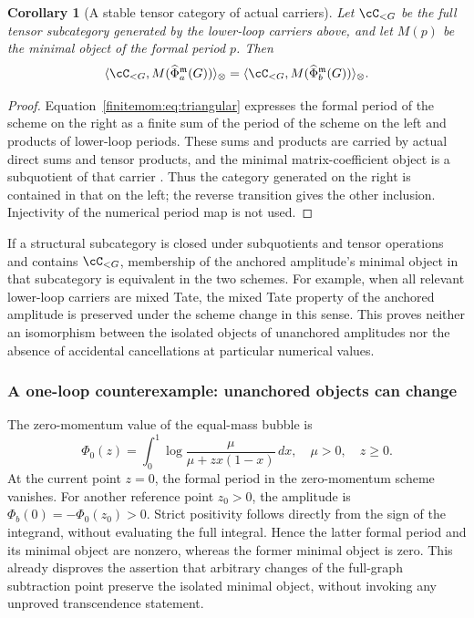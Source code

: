 \documentclass[11pt,a4paper,oneside]{article}
\theoremstyle{plain}
\newtheorem{corollary}[theorem]{Corollary}
\theoremstyle{definition}
\theoremstyle{remark}
\numberwithin{equation}{section}
\begin{document}
\begin{corollary}[A stable tensor category of actual carriers]\label{finitemom:cor:category}
Let $\cC_{<G}$ be the full tensor subcategory generated by the lower-loop carriers above, and let $M(p)$ be the minimal object of the formal period $p$.
Then
\begin{equation}\label{finitemom:eq:category}
 \langle\cC_{<G},M(\widehat\Phi_a^{\mathfrak m}(G))\rangle_\otimes
 =\langle\cC_{<G},M(\widehat\Phi_b^{\mathfrak m}(G))\rangle_\otimes.
\end{equation}
\end{corollary}
\begin{proof}
Equation~\eqref{finitemom:eq:triangular} expresses the formal period of the scheme on the right as a finite sum of the period of the scheme on the left and products of lower-loop periods.
These sums and products are carried by actual direct sums and tensor products, and the minimal matrix-coefficient object is a subquotient of that carrier \cite{brownperiods}.
Thus the category generated on the right is contained in that on the left; the reverse transition gives the other inclusion.
Injectivity of the numerical period map is not used.
\end{proof}

If a structural subcategory is closed under subquotients and tensor operations and contains $\cC_{<G}$, membership of the anchored amplitude's minimal object in that subcategory is equivalent in the two schemes.
For example, when all relevant lower-loop carriers are mixed Tate, the mixed Tate property of the anchored amplitude is preserved under the scheme change in this sense.
This proves neither an isomorphism between the isolated objects of unanchored amplitudes nor the absence of accidental cancellations at particular numerical values.

\subsubsection{A one-loop counterexample: unanchored objects can change}
The zero-momentum value of the equal-mass bubble is
\begin{equation}\label{finitemom:eq:bubble}
 \Phi_0(z)=\int_0^1\log\frac{\mu}{\mu+z x(1-x)}\,dx,
 \quad \mu>0,\quad z\geq0.
\end{equation}
At the current point $z=0$, the formal period in the zero-momentum scheme vanishes.
For another reference point $z_0>0$, the amplitude is $\Phi_b(0)=-\Phi_0(z_0)>0$.
Strict positivity follows directly from the sign of the integrand, without evaluating the full integral.
Hence the latter formal period and its minimal object are nonzero, whereas the former minimal object is zero.
This already disproves the assertion that arbitrary changes of the full-graph subtraction point preserve the isolated minimal object, without invoking any unproved transcendence statement.
\end{document}
